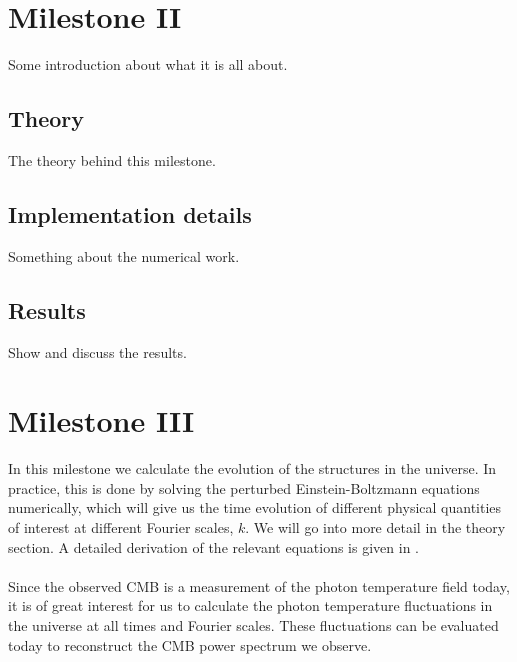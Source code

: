 \documentclass{aa}
\begin{document}
\section{Milestone II}
Some introduction about what it is all about.

\subsection{Theory}
The theory behind this milestone.

\subsection{Implementation details}
Something about the numerical work.

\subsection{Results}
Show and discuss the results.


\section{Milestone III}
In this milestone we calculate the evolution of the structures in the universe. In practice, this is done by 
solving the perturbed Einstein-Boltzmann equations numerically, which will give us the time evolution of different physical quantities of interest
at different Fourier scales, $k$. We will go into more detail in the theory section. A detailed derivation of the relevant equations is given in \cite{winther:2023}. \\
\\
Since the observed CMB is a measurement of the photon temperature field today, it is of great interest for us to calculate the photon temperature fluctuations 
in the universe at all times and Fourier scales. These fluctuations can be evaluated today to reconstruct the CMB power spectrum we observe. 
\end{document}
